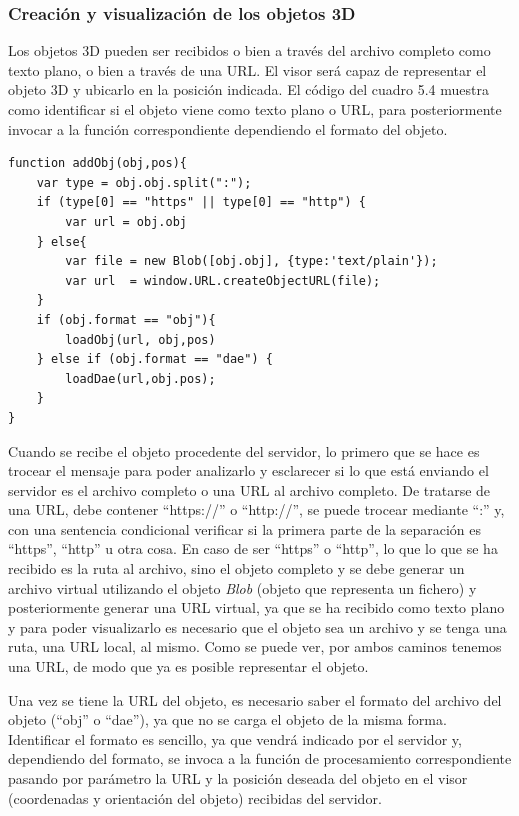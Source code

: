 \subsubsection{Creación y visualización de los objetos 3D}
Los objetos 3D pueden ser recibidos o bien a través del archivo completo como texto plano, o bien a través de una URL. El visor será capaz de representar el objeto 3D y ubicarlo en la posición indicada. El código del cuadro 5.4 muestra como identificar si el objeto viene como texto plano o URL, para posteriormente invocar a la función correspondiente dependiendo el formato del objeto.
\begin{lstlisting}[caption= Creación y visualización de objetos 3D, label=cod.crearobjetos3d]
function addObj(obj,pos){
	var type = obj.obj.split(":");
	if (type[0] == "https" || type[0] == "http") {
		var url = obj.obj
	} else{
		var file = new Blob([obj.obj], {type:'text/plain'});
		var url  = window.URL.createObjectURL(file);
	}
	if (obj.format == "obj"){
		loadObj(url, obj,pos)
	} else if (obj.format == "dae") {
		loadDae(url,obj.pos);
	}
}
\end{lstlisting}
Cuando se recibe el objeto procedente del servidor, lo primero que se hace es trocear el mensaje para poder analizarlo y esclarecer si lo que está enviando el servidor es el archivo completo o una URL al archivo completo. De tratarse de una URL, debe contener ``https://'' o ``http://'', se puede trocear mediante ``:'' y, con una sentencia condicional verificar si la primera parte de la separación es ``https'', ``http'' u otra cosa. En caso de ser ``https'' o ``http'', lo que lo que se ha recibido es la ruta al archivo, sino el objeto completo y se debe generar un archivo virtual utilizando el objeto \textit{Blob} (objeto que representa un fichero) y posteriormente generar una URL virtual, ya que se ha recibido como texto plano y para poder visualizarlo es necesario que el objeto sea un archivo y se tenga una ruta, una URL local, al mismo. Como se puede ver, por ambos caminos tenemos una URL, de modo que ya es posible representar el objeto.

Una vez se tiene la URL del objeto, es necesario saber el formato del archivo del objeto (``obj'' o ``dae''), ya que no se carga el objeto de la misma forma. Identificar el formato es sencillo, ya que vendrá indicado por el servidor y, dependiendo del formato, se invoca a la función de procesamiento correspondiente pasando por parámetro la URL y la posición deseada del objeto en el visor (coordenadas y orientación del objeto) recibidas del servidor.

